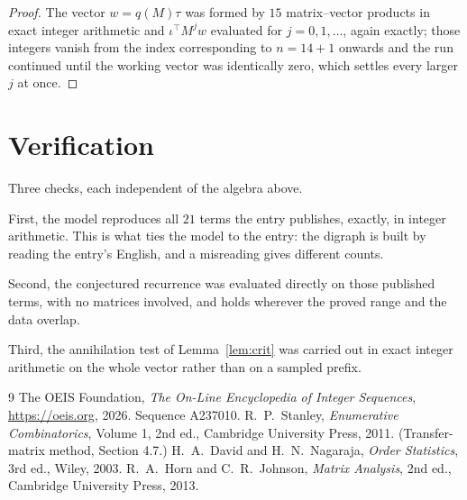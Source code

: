 \documentclass[11pt,a4paper]{article}
\theoremstyle{plain}
\theoremstyle{definition}
\begin{document}
\begin{proof}
The vector $w=q(M)\tau$ was formed by $15$ matrix--vector products in exact integer
arithmetic and $\iota^{\!\top}M^{j}w$ evaluated for $j=0,1,\dots$, again exactly; those
integers vanish from the index corresponding to $n=14+1$ onwards and the run continued
until the working vector was identically zero, which settles every larger $j$ at once.
\end{proof}

\section{Verification}

Three checks, each independent of the algebra above.

First, the model reproduces all $21$ terms the entry publishes, exactly, in integer
arithmetic. This is what ties the model to the entry: the digraph is built by reading the
entry's English, and a misreading gives different counts.

Second, the conjectured recurrence was evaluated directly on those published terms, with no
matrices involved, and holds wherever the proved range and the data overlap.

Third, the annihilation test of Lemma~\ref{lem:crit} was carried out in exact integer
arithmetic on the whole vector rather than on a sampled prefix.

\begin{thebibliography}{9}
 The OEIS Foundation, \emph{The On-Line Encyclopedia of Integer
Sequences}, \url{https://oeis.org}, 2026. Sequence A237010.
 R.~P.~Stanley, \emph{Enumerative Combinatorics}, Volume 1, 2nd ed.,
Cambridge University Press, 2011. (Transfer-matrix method, Section 4.7.)
 H.~A.~David and H.~N.~Nagaraja, \emph{Order Statistics}, 3rd ed., Wiley,
2003.
 R.~A.~Horn and C.~R.~Johnson, \emph{Matrix Analysis}, 2nd ed., Cambridge
University Press, 2013.
\end{thebibliography}
\end{document}
